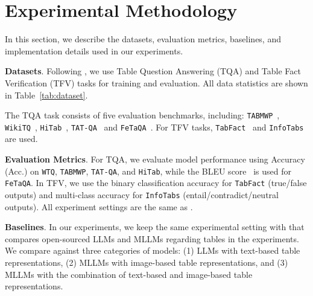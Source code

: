 
\section{Experimental Methodology}
In this section, we describe the datasets, evaluation metrics, baselines, and implementation details used in our experiments.

\textbf{Datasets}. Following \citet{ZhengFSS0J024}, we use Table Question Answering (TQA) and Table Fact Verification (TFV) tasks for training and evaluation.
All data statistics are shown in Table~\ref{tab:dataset}.


The TQA task consists of five evaluation benchmarks, including: \texttt{TABMWP}~\cite{lu2023dynamic}, \texttt{WikiTQ}~\cite{pasupat-liang-2015-compositional}, \texttt{HiTab}~\cite{cheng-etal-2022-hitab}, \texttt{TAT-QA}~\cite{zhu-etal-2021-tat} and \texttt{FeTaQA}~\cite{Nan2021FeTaQAFT}. For TFV tasks, \texttt{TabFact}~\cite{2019TabFactA} and \texttt{InfoTabs}~\cite{gupta-etal-2020-infotabs} are used. %





\textbf{Evaluation Metrics}. For TQA, we evaluate model performance using Accuracy (Acc.) on \texttt{WTQ}, \texttt{TABMWP}, \texttt{TAT-QA}, and \texttt{HiTab}, while the BLEU score~\cite{papineni2002bleu} is used for \texttt{FeTaQA}. In TFV, we use the binary classification accuracy for \texttt{TabFact} (true/false outputs) and multi-class accuracy for \texttt{InfoTabs} (entail/contradict/neutral outputs). All experiment settings are the same as \citet{ZhengFSS0J024}.

\textbf{Baselines}. In our experiments, we keep the same experimental setting with \citet{ZhengFSS0J024} that compares open-sourced LLMs and MLLMs regarding tables in the experiments. We compare \method{} against three categories of models: (1) LLMs with text-based table representations, (2) MLLMs with image-based table representations, and (3) MLLMs with the combination of text-based and image-based table representations.

